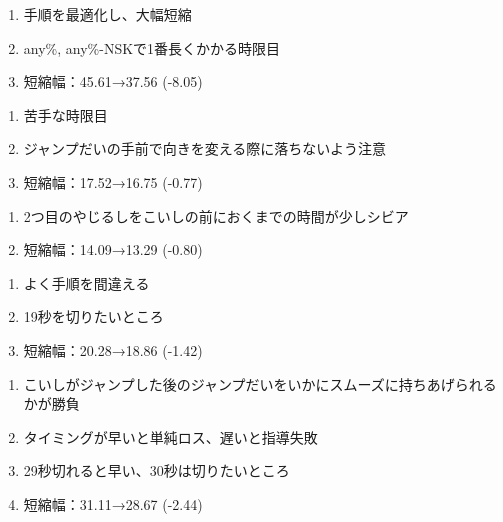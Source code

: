 \begin{enumerate}[label={\sarrow}]
\item 手順を最適化し、大幅短縮
\item any\%, any\%-NSKで1番長くかかる時限目
\item 短縮幅：45.61→37.56 (-8.05)
\end{enumerate}



\begin{enumerate}[label={\sarrow}]
\item 苦手な時限目
\item ジャンプだいの手前で向きを変える際に落ちないよう注意
\item 短縮幅：17.52→16.75 (-0.77)
\end{enumerate}



\begin{enumerate}[label={\sarrow}]
\item 2つ目のやじるしをこいしの前におくまでの時間が少しシビア
\item 短縮幅：14.09→13.29 (-0.80)
\end{enumerate}



\begin{enumerate}[label={\sarrow}]
\item よく手順を間違える
\item 19秒を切りたいところ
\item 短縮幅：20.28→18.86 (-1.42)
\end{enumerate}



\clearpage
\begin{enumerate}[label={\sarrow}]
\item こいしがジャンプした後のジャンプだいをいかにスムーズに持ちあげられるかが勝負
\item タイミングが早いと単純ロス、遅いと指導失敗
\item 29秒切れると早い、30秒は切りたいところ
\item 短縮幅：31.11→28.67 (-2.44)
\end{enumerate}



